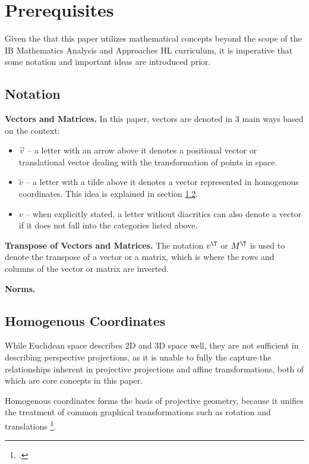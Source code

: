 \section{Prerequisites}

Given the that this paper utilizes mathematical concepts beyond the scope of the IB Mathematics Analysis and Approaches HL curriculum, it is imperative that some notation and important ideas are introduced prior.

\subsection{Notation}
\noindent\textbf{Vectors and Matrices.} In this paper, vectors are denoted in 3 main ways based on the context:
\begin{itemize}[leftmargin=!, itemindent=-4ex]
    \item \textbf{$\vec{v}$} -- a letter with an arrow above it denotes a positional vector or translational vector dealing with the transformation of points in space.
    \item \textbf{$\widetilde{v}$} -- a letter with a tilde above it denotes a vector represented in homogenous coordinates. This idea is explained in section \ref{sec:homogenous}.
    \item \textbf{$v$} -- when explicitly stated, a letter without diacritics can also denote a vector if it does not fall into the categories listed above. 
\end{itemize}

\noindent\textbf{Transpose of Vectors and Matrices.} The notation $v^\T$ or $M^\T$ is used to denote the transpose of a vector or a matrix, which is where the rows and columns of the vector or matrix are inverted. 

\noindent\textbf{Norms.} 

\subsection{Homogenous Coordinates} \label{sec:homogenous}

While Euclidean space describes 2D and 3D space well, they are not sufficient in describing perspective projections, as it is unable to fully the capture the relationships inherent in projective projections and affine transformations, both of which are core concepts in this paper. 

Homogenous coordinates forms the basis of projective geometry, because it unifies the treatment of common graphical transformations such as rotation and translations \footcite[][1]{bloomenthalHomogeneousCoordinates1994}. 

